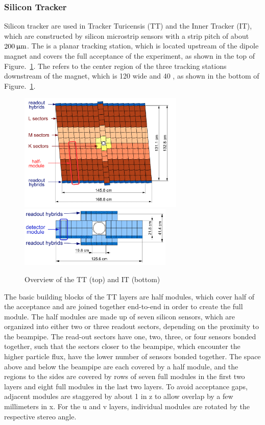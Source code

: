 \subsubsection{Silicon Tracker}

Silicon tracker are used in Tracker Turicensis (TT) and the Inner Tracker (IT),
which are constructed by silicon microstrip sensors with a strip pitch of about $200\,\upmu\text{m}$.
The \ttracker is a planar tracking station, 
which is located upstream of the \lhcb dipole magnet and covers the full acceptance of the experiment, 
as shown in the top of Figure.~\ref{fig:UT}.
The \intr refers to the center region of the three tracking stations downstream of the magnet,
which is 120 \cm wide and 40 \cm, 
as shown in the bottom of Figure.~\ref{fig:UT}.

\begin{figure}[!hbtp]
\centering
\includegraphics[width=0.7\textwidth]{Figures/02_Detector/UT} \\%
\includegraphics[width=0.65\textwidth]{Figures/02_Detector/IT}%
	\caption{ Overview of the TT (top) and IT (bottom)\supercite{LHCb-DP-2008-001}}
\label{fig:UT}
\end{figure}

The basic building blocks of the TT layers are half modules, 
which cover half of the acceptance and are joined together end-to-end in order to create the full module. 
The half modules are made up of seven silicon sensors, 
which are organized into either two or three readout sectors, 
depending on the proximity to the beampipe. 
The read-out sectors have one, two, three, or four sensors bonded together, 
such that the sectors closer to the beampipe, 
which encounter the higher particle flux, 
have the lower number of sensors bonded together. 
The space above and below the beampipe are each covered by a half module, 
and the regions to the sides are covered by rows of seven full modules in the first two layers and eight full modules in the last two layers. 
To avoid acceptance gaps, adjacent modules are staggered by about 1 \cm in z to allow overlap by a few millimeters in x. 
For the u and v layers, individual modules are rotated by the respective stereo angle. 

